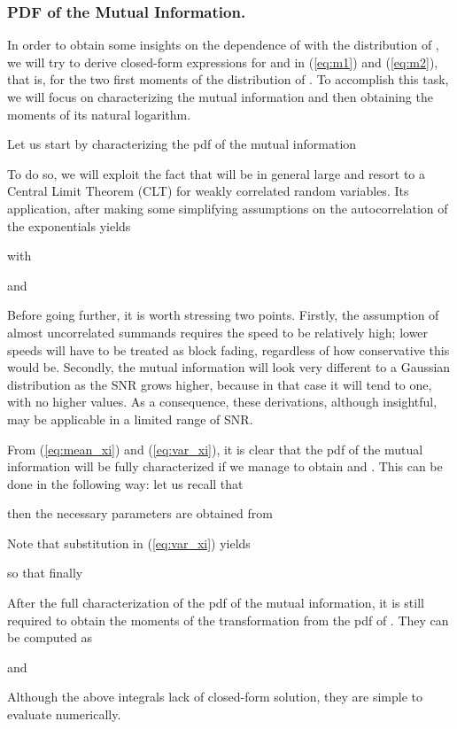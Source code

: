 \documentclass[journal,onecolumn,10pt,a4paper]{IEEEtran}
\begin{document}
\subsubsection{PDF of the Mutual Information.}
\label{subsec:mi}
In order to obtain some insights on the dependence of  with the distribution of , we will try to derive closed-form expressions for  and  in (\ref{eq:m1}) and (\ref{eq:m2}), that is, for the two first moments of the distribution of . To accomplish this task, we will focus on characterizing the mutual information  and then obtaining the moments of its natural logarithm.

Let us start by characterizing the pdf of the mutual information 

To do so, we will exploit the fact that  will be in general large and resort to a Central Limit Theorem (CLT) for weakly correlated random variables\cite{billingsley95}. Its application, after making some simplifying assumptions on the autocorrelation of the exponentials  yields

with

and 



Before going further, it is worth stressing two points. Firstly, the assumption of almost uncorrelated summands requires the speed to be relatively high; lower speeds will have to be treated as block fading, regardless of how conservative this would be. Secondly, the mutual information will look very different to a Gaussian distribution as the SNR grows higher, because in that case it will tend to one, with no higher values. As a consequence, these derivations, although insightful, may be applicable in a limited range of SNR.

From (\ref{eq:mean_xi}) and (\ref{eq:var_xi}), it is clear that the pdf of the mutual information will be fully characterized if we manage to obtain  and . This can be done in the following way: let us recall that

then the necessary parameters are obtained from


Note that substitution in (\ref{eq:var_xi}) yields

so that finally


After the full characterization of the pdf of the mutual information, it is still required to obtain the moments of the transformation  from the pdf of . They can be computed as


and

Although the above integrals lack of closed-form solution, they are simple to evaluate numerically.
\end{document}
